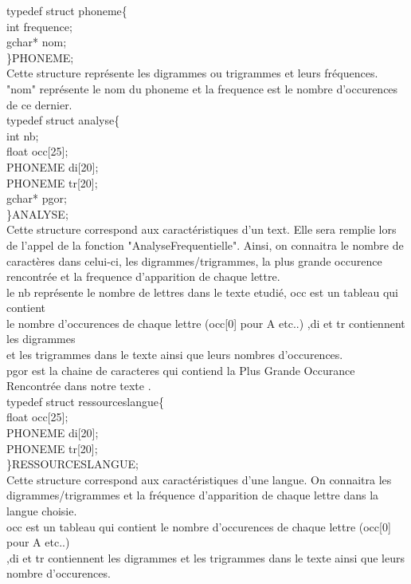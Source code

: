 \documentclass[a4]{article}
\begin{document}
		
		
	typedef struct phoneme\{\\
		int frequence;\\
		gchar* nom;\\
	\}PHONEME;\\
	Cette structure représente les digrammes ou trigrammes et leurs fréquences.\\
	"nom" représente le nom du phoneme et la frequence est le nombre d'occurences\\
	de ce dernier.\\
	
	typedef struct analyse\{ \\
		int nb; \\
		float occ[25];\\
		PHONEME di[20];\\
		PHONEME tr[20];\\
		gchar* pgor;\\
	\}ANALYSE;\\
	Cette structure correspond aux caractéristiques d'un text. Elle sera remplie lors de
	l'appel de la fonction "AnalyseFrequentielle". Ainsi, on connaitra
	le nombre de caractères dans celui-ci, les digrammes/trigrammes, la plus grande occurence
	rencontrée et la frequence d'apparition de chaque lettre.\\
	le nb représente le nombre de lettres dans le texte etudié, occ est un tableau qui contient \\
	le nombre d'occurences de chaque lettre (occ[0] pour A etc..) ,di et tr contiennent les digrammes \\
	et les trigrammes dans le texte ainsi que leurs nombres d'occurences.\\
	pgor est la chaine de caracteres qui contiend la Plus Grande Occurance Rencontrée dans notre texte .\\
	
	
	typedef struct ressourceslangue\{ \\
		float occ[25];\\
		PHONEME di[20];\\
		PHONEME tr[20];\\
	\}RESSOURCESLANGUE;\\
	Cette structure correspond aux caractéristiques d'une langue. On connaitra
	les digrammes/trigrammes et la fréquence d'apparition de chaque lettre dans la langue choisie.\\
	occ est un tableau qui contient le nombre d'occurences de chaque lettre (occ[0] pour A etc..) \\
	,di et tr contiennent les digrammes et les trigrammes dans le texte ainsi que leurs nombre d'occurences.
\end{document}
